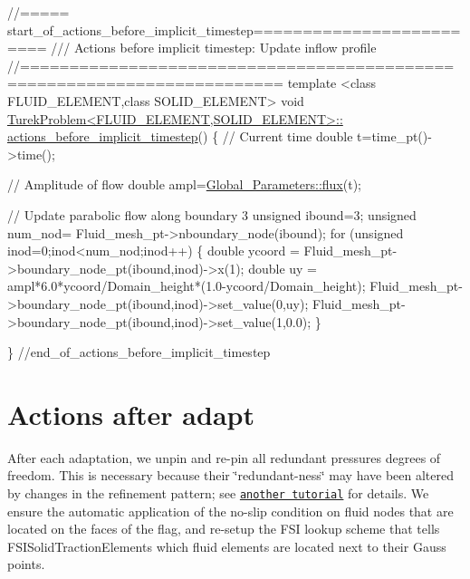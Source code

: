 \begin{DoxyCodeInclude}
\textcolor{comment}{//===== start\_of\_actions\_before\_implicit\_timestep=========================}
\textcolor{comment}{/// Actions before implicit timestep: Update inflow profile}
\textcolor{comment}{}\textcolor{comment}{//========================================================================}
\textcolor{keyword}{template} <\textcolor{keyword}{class} FLUID\_ELEMENT,\textcolor{keyword}{class} SOLID\_ELEMENT> 
\textcolor{keywordtype}{void} \hyperlink{classTurekProblem_a4ad226ceec27cb3c3ea4d1ecfd4e573f}{TurekProblem<FLUID\_ELEMENT,SOLID\_ELEMENT>::}
\hyperlink{classTurekProblem_a4ad226ceec27cb3c3ea4d1ecfd4e573f}{actions\_before\_implicit\_timestep}()
\{
 \textcolor{comment}{// Current time}
 \textcolor{keywordtype}{double} t=time\_pt()->time();
 
 \textcolor{comment}{// Amplitude of flow}
 \textcolor{keywordtype}{double} ampl=\hyperlink{namespaceGlobal__Parameters_a536aa5314a6cdb36af852e9513351d55}{Global\_Parameters::flux}(t);
 
 \textcolor{comment}{// Update parabolic flow along boundary 3}
 \textcolor{keywordtype}{unsigned} ibound=3; 
 \textcolor{keywordtype}{unsigned} num\_nod= Fluid\_mesh\_pt->nboundary\_node(ibound);
 \textcolor{keywordflow}{for} (\textcolor{keywordtype}{unsigned} inod=0;inod<num\_nod;inod++)
  \{
   \textcolor{keywordtype}{double} ycoord = Fluid\_mesh\_pt->boundary\_node\_pt(ibound,inod)->x(1); 
   \textcolor{keywordtype}{double} uy = ampl*6.0*ycoord/Domain\_height*(1.0-ycoord/Domain\_height);
   Fluid\_mesh\_pt->boundary\_node\_pt(ibound,inod)->set\_value(0,uy);
   Fluid\_mesh\_pt->boundary\_node\_pt(ibound,inod)->set\_value(1,0.0);    
  \}

\} \textcolor{comment}{//end\_of\_actions\_before\_implicit\_timestep}

\end{DoxyCodeInclude}




 

\hypertarget{index_after_adapt}{}\section{Actions after adapt}\label{index_after_adapt}
After each adaptation, we unpin and re-\/pin all redundant pressures degrees of freedom. This is necessary because their \char`\"{}redundant-\/ness\char`\"{} may have been altered by changes in the refinement pattern; see \href{../../../navier_stokes/adaptive_driven_cavity/html/index.html}{\tt another tutorial} for details. We ensure the automatic application of the no-\/slip condition on fluid nodes that are located on the faces of the flag, and re-\/setup the F\+SI lookup scheme that tells {\ttfamily F\+S\+I\+Solid\+Traction\+Elements} which fluid elements are located next to their Gauss points.


